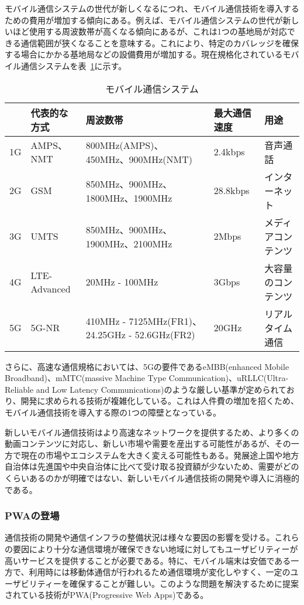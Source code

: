 モバイル通信システムの世代が新しくなるにつれ、モバイル通信技術を導入するための費用が増加する傾向にある。例えば、モバイル通信システムの世代が新しいほど使用する周波数帯が高くなる傾向にあるが、これは1つの基地局が対応できる通信範囲が狭くなることを意味する。これにより、特定のカバレッジを確保する場合にかかる基地局などの設備費用が増加する。現在規格化されているモバイル通信システムを表~\ref{table:モバイル通信システム}に示す。
\begin{table}
    \centering
    \caption{モバイル通信システム}
    \label{table:モバイル通信システム}
    \begin{tabular}{|p{3em}|p{10em}|p{12em}|p{5em}|p{10em}|}
         \hline
         & 代表的な方式 & 周波数帯 & 最大通信速度 & 用途 \\ \hline
         1G & AMPS、NMT & 800MHz(AMPS)、450MHz、900MHz(NMT) & 2.4kbps & 音声通話 \\ \hline
         2G & GSM & 850MHz、900MHz、1800MHz、1900MHz & 28.8kbps & インターネット \\ \hline
         3G & UMTS & 850MHz、900MHz、1900MHz、2100MHz & 2Mbps & メディアコンテンツ \\ \hline
         4G & LTE-Advanced & 20MHz - 100MHz & 3Gbps & 大容量のコンテンツ \\ \hline
         5G & 5G-NR & 410MHz - 7125MHz(FR1)、24.25GHz - 52.6GHz(FR2) & 20GHz & リアルタイム通信 \\ \hline
    \end{tabular}
\end{table}

さらに、高速な通信規格においては、5Gの要件であるeMBB(enhanced Mobile Broadband)、mMTC(massive Machine Type Communication)、uRLLC(Ultra-Reliable and Low Latency Communications)のような厳しい基準が定められており、開発に求められる技術が複雑化している。これは人件費の増加を招くため、モバイル通信技術を導入する際の1つの障壁となっている。

新しいモバイル通信技術はより高速なネットワークを提供するため、より多くの動画コンテンツに対応し、新しい市場や需要を産出する可能性があるが、その一方で現在の市場やエコシステムを大きく変える可能性もある。発展途上国や地方自治体は先進国や中央自治体に比べて受け取る投資額が少ないため、需要がどのくらいあるのかが明確ではない、新しいモバイル通信技術の開発や導入に消極的である。
\subsubsection{PWAの登場}
\label{subsubsection:PWAの登場}
通信技術の開発や通信インフラの整備状況は様々な要因の影響を受ける。これらの要因により十分な通信環境が確保できない地域に対してもユーザビリティーが高いサービスを提供することが必要である。特に、モバイル端末は安価である一方で、利用時には移動体通信が行われるため通信環境が変化しやすく、一定のユーザビリティーを確保することが難しい。このような問題を解決するために提案されている技術がPWA(Progressive Web Apps)である。

